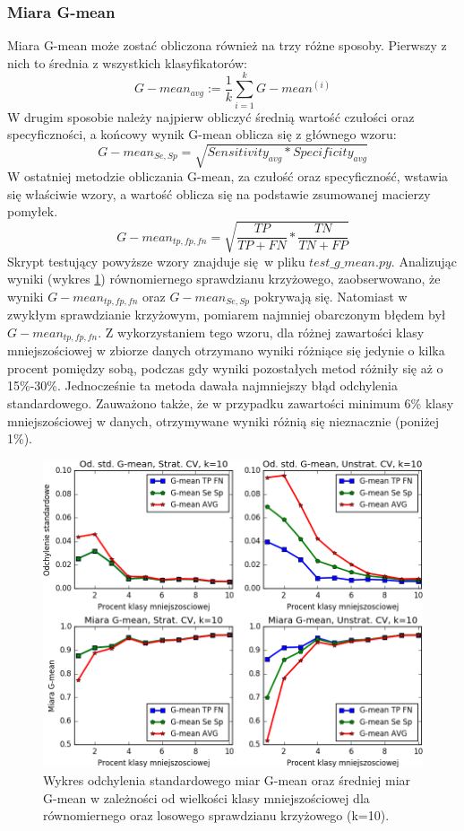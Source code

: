\subsubsection{Miara G-mean}
Miara G-mean może zostać obliczona również na trzy różne sposoby. Pierwszy z nich to średnia z wszystkich klasyfikatorów:
\[G-mean_{avg} := \frac{1}{k} \sum_{i=1}^{k} G-mean^{(i)} \]
W drugim sposobie należy najpierw obliczyć średnią wartość czułości oraz specyficzności, a końcowy wynik G-mean oblicza się z głównego wzoru:
\[G-mean_{Se, Sp} = \sqrt{Sensitivity_{avg}*Specificity_{avg}} \]
W ostatniej metodzie obliczania G-mean, za czułość oraz specyficzność, wstawia się właściwie wzory, a wartość oblicza się na podstawie zsumowanej macierzy pomyłek.
\[G-mean_{tp, fp, fn} = \sqrt{\frac{TP}{TP + FN}*\frac{TN}{TN + FP}} \]
Skrypt testujący powyższe wzory znajduje się w pliku $test\_g\_mean.py$. Analizując wyniki (wykres \ref{fig:wykresgmean}) równomiernego sprawdzianu krzyżowego, zaobserwowano, że  wyniki $G-mean_{tp, fp, fn}$ oraz $G-mean_{Se, Sp}$ pokrywają się. Natomiast w zwykłym sprawdzianie krzyżowym, pomiarem najmniej obarczonym błędem był $G-mean_{tp, fp, fn}$. Z wykorzystaniem tego wzoru, dla różnej zawartości klasy mniejszościowej w zbiorze danych otrzymano wyniki różniące się jedynie o kilka procent pomiędzy sobą, podczas gdy wyniki pozostałych metod różniły się aż o 15\%-30\%. Jednocześnie ta metoda dawała najmniejszy błąd odchylenia standardowego. Zauważono także, że w przypadku zawartości minimum 6\% klasy mniejszościowej w danych, otrzymywane wyniki różnią się nieznacznie (poniżej 1\%).
\begin{figure}[H]
	\centering
	\includegraphics[width=\textwidth]{./images/miara-G-mean.png}
	\caption{Wykres odchylenia standardowego miar G-mean oraz średniej miar G-mean w zależności od wielkości klasy mniejszościowej dla równomiernego oraz losowego sprawdzianu krzyżowego (k=10).}
	\label{fig:wykresgmean}
\end{figure}
